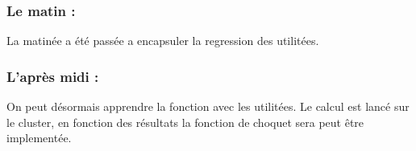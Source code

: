 \subsubsection*{Le matin :}
La matinée a été passée a encapsuler la regression des utilitées.

\subsubsection*{L'après midi :}
On peut désormais apprendre la fonction avec les utilitées.
Le calcul est lancé sur le cluster, en fonction des résultats la fonction de choquet sera peut être implementée.

